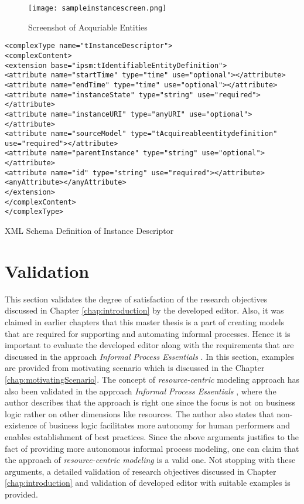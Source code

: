 \begin{figure}
	\centering
	\texttt{[image: sampleinstancescreen.png]}
	\caption{Screenshot of Acquriable Entities}
	\label{fig:realizationofinstances}
\end{figure}


\begin{Listing}
	\begin{lstlisting}
<complexType name="tInstanceDescriptor">
<complexContent>
<extension base="ipsm:tIdentifiableEntityDefinition">
<attribute name="startTime" type="time" use="optional"></attribute>
<attribute name="endTime" type="time" use="optional"></attribute>
<attribute name="instanceState" type="string" use="required"></attribute>
<attribute name="instanceURI" type="anyURI" use="optional"></attribute>
<attribute name="sourceModel" type="tAcquireableentitydefinition" use="required"></attribute>
<attribute name="parentInstance" type="string" use="optional"></attribute>
<attribute name="id" type="string" use="required"></attribute>
<anyAttribute></anyAttribute>
</extension>
</complexContent>
</complexType>		
\end{lstlisting}
\caption{XML Schema Definition of Instance Descriptor}
\label{lst:xsdinstances}
\end{Listing}
		
\section{Validation}
\label{sec:validation}
This section validates the degree of satisfaction of the research objectives discussed in Chapter \ref{chap:introduction} by the developed editor. Also, it was claimed in earlier chapters that this master thesis is a part of creating models that are required for supporting and automating informal processes. Hence it is important to evaluate the developed editor along with the requirements that are discussed in the approach \textit{Informal Process Essentials} \cite{Sungur2014a}. In this section, examples are provided from motivating scenario which is discussed in the Chapter \ref{chap:motivatingScenario}. The concept of \textit{resource-centric} modeling approach has also been validated in the approach \textit{Informal Process Essentials} \cite{Sungur2014a}, where the author describes that the approach is right one since the focus is not on business logic rather on other dimensions like resources. The author also states that non-existence of business logic facilitates more autonomy for human performers and enables establishment of best practices. Since the above arguments justifies to the fact of providing more autonomous informal process modeling, one can claim that the approach of \textit{resource-centric modeling} is a valid one. Not stopping with these arguments, a detailed validation of research objectives discussed in Chapter \ref{chap:introduction} and validation of developed editor with suitable examples is provided.
		
